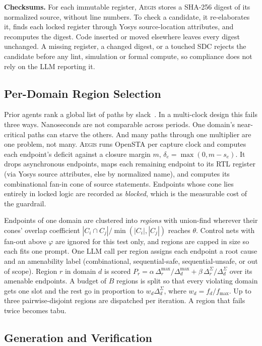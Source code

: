 \documentclass[conference,10pt]{IEEEtran}
\newcommand{\aegis}{\textsc{Aegis}}
\begin{document}
\textbf{Checksums.} For each immutable register, \aegis{} stores a SHA-256 digest of its normalized source,
without line numbers. To check a candidate, it re-elaborates it, finds each locked register through Yosys
source-location attributes, and recomputes the digest. Code inserted or moved elsewhere leaves every digest
unchanged. A missing register, a changed digest, or a touched SDC rejects the candidate before any lint, simulation
or formal compute, so compliance does not rely on the LLM reporting it.

\subsection{Per-Domain Region Selection}

Prior agents rank a global list of paths by slack~\cite{drrtl2026}. In a multi-clock design this fails three ways.
Nanoseconds are not comparable across periods. One domain's near-critical paths can starve the others. And many
paths through one multiplier are one problem, not many. \aegis{} runs OpenSTA per capture clock and computes each
endpoint's deficit against a closure margin $m$, $\delta_e=\max(0,m-s_e)$. It drops asynchronous endpoints, maps
each remaining endpoint to its RTL register (via Yosys source attributes, else by normalized name), and computes its
combinational fan-in cone of source statements. Endpoints whose cone lies entirely in locked logic are recorded as
\emph{blocked}, which is the measurable cost of the guardrail.

Endpoints of one domain are clustered into \emph{regions} with union-find wherever their cones' overlap
coefficient $|C_i\cap C_j|/\min(|C_i|,|C_j|)$ reaches $\theta$. Control nets with fan-out above $\varphi$ are
ignored for this test only, and regions are capped in size so each fits one prompt. One LLM call per region assigns
each endpoint a root cause and an amenability label (combinational, sequential-safe, sequential-unsafe, or out of
scope). Region $r$ in domain $d$ is scored
$P_r=\alpha\,\Delta^{\max}_r/\Delta^{\max}_d+\beta\,\Delta^{\Sigma}_r/\Delta^{\Sigma}_d$ over its amenable
endpoints. A budget of $B$ regions is split so that every violating domain gets one slot and the rest go in
proportion to $w_d\Delta^{\Sigma}_d$, where $w_d=f_d/f_{\max}$. Up to three pairwise-disjoint regions are dispatched
per iteration. A region that fails twice becomes tabu.

\subsection{Generation and Verification}
\end{document}
